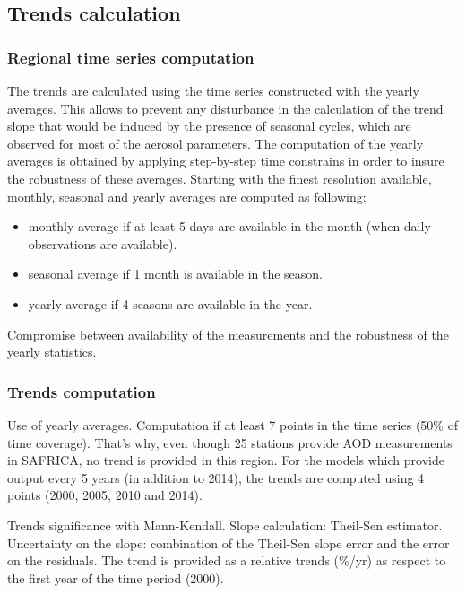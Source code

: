 \documentclass[journal abbreviation, manuscript]{copernicus}
\begin{document}
\subsection{Trends calculation}

\subsubsection{Regional time series computation}
The trends are calculated using the time series constructed with the yearly averages. This allows to prevent any disturbance in the calculation of the trend slope that would be induced by the presence of seasonal cycles, which are observed for most of the aerosol parameters. The computation of the yearly averages is obtained by applying step-by-step time constrains in order to insure the robustness of these averages. Starting with the finest resolution available, monthly, seasonal and yearly averages are computed as following:
\begin{itemize}
 \item monthly average if at least 5 days are available in the month (when daily observations are available).
 \item seasonal average if 1 month is available in the season.
 \item yearly average if 4 seasons are available in the year.
\end{itemize}
Compromise between availability of the measurements and the robustness of the yearly statistics.

\subsubsection{Trends computation}
Use of yearly averages. Computation if at least 7 points in the time series (50\% of time coverage). That's why, even though 25 stations provide AOD measurements in SAFRICA, no trend is provided in this region. For the models which provide output every 5 years (in addition to 2014), the trends are computed using 4 points (2000, 2005, 2010 and 2014).

Trends significance with Mann-Kendall.
Slope calculation: Theil-Sen estimator.
Uncertainty on the slope: combination of the Theil-Sen slope error and the error on the residuals.
The trend is provided as a relative trends (\%/yr) as respect to the first year of the time period (2000).
\end{document}
